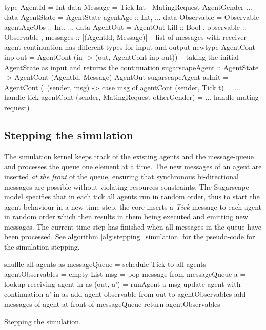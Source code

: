 \begin{HaskellCode}
type AgentId    = Int
data Message    = Tick Int | MatingRequest AgentGender ... 
data AgentState = AgentState { agentAge :: Int, ... }             
data Observable = Observable { agentAgeObs :: Int, ... } 
data AgentOut   = AgentOut
  { kill       :: Bool
  , observable :: Observable
  , messages   :: [(AgentId, Message)] -- list of messages with receiver
  }
-- agent continuation has different types for input and output
newtype AgentCont inp out = AgentCont (in -> (out, AgentCont inp out))
-- taking the initial AgentState as input and returns the continuation
sugarscapeAgent :: AgentState -> AgentCont (AgentId, Message) AgentOut
sugarscapeAgent asInit = AgentCont (\ (sender, msg) -> 
  case msg of
    agentCont (sender, Tick t) = ... handle tick
    agentCont (sender, MatingRequest otherGender) = ... handle mating request)
\end{HaskellCode}

\subsection{Stepping the simulation}
The simulation kernel keeps track of the existing agents and the message-queue and processes the queue one element at a time. The new messages of an agent are inserted \textit{at the front} of the queue, ensuring that synchronous bi-directional messages are possible without violating resources constraints. The Sugarscape model specifies that in each tick all agents run in random order, thus to start the agent-behaviour in a new time-step, the core inserts a \textit{Tick} message to each agent in random order which then results in them being executed and emitting new messages. The current time-step has finished when all messages in the queue have been processed. See algorithm \ref{alg:stepping_simulation} for the pseudo-code for the simulation stepping.

\begin{algorithm}
shuffle all agents as\;
messageQueue = schedule Tick to all agents\;
agentObservables = empty List\;
 {
  msg = pop message from messageQueue\;
  a = lookup receiving agent in as\;
  (out, a') = runAgent a msg\;
  update agent with continuation a' in as\;
  add agent observable from out to agentObservables\;
  add messages of agent at front of messageQueue\;
}
return agentObservables\;
\caption{Stepping the simulation.}
\end{algorithm}
\label{alg:stepping_simulation}

